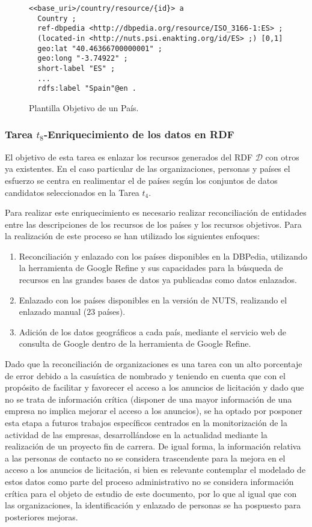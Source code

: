 \begin{figure}[!htp]
\begin{lstlisting} 
<<base_uri>/country/resource/{id}> a 
  Country ;
  ref-dbpedia <http://dbpedia.org/resource/ISO_3166-1:ES> ;
  (located-in <http://nuts.psi.enakting.org/id/ES> ;) [0,1]
  geo:lat "40.46366700000001" ;
  geo:long "-3.74922" ;
  short-label "ES" ;
  ...
  rdfs:label "Spain"@en .
\end{lstlisting}
	\caption{Plantilla Objetivo de un País.}
	\label{fig:country-template}
\end{figure}


\subsubsection{Tarea $t_8$-Enriquecimiento de los datos en RDF}\label{t8-orgs}
El objetivo de esta tarea es enlazar los recursos generados del \dataset \gls{RDF} $\mathcal{D}$ con otros 
ya existentes. En el caso particular de las organizaciones, personas y países el esfuerzo se centra 
en realimentar el \dataset de países según los conjuntos de datos candidatos seleccionados en la Tarea $t_4$.

Para realizar este enriquecimiento es necesario realizar reconciliación de entidades entre las descripciones 
de los recursos de los países y los recursos objetivos. Para la realización de este proceso se han utilizado los 
siguientes enfoques:
\begin{enumerate}
 \item Reconciliación y enlazado con los países disponibles en la DBPedia, utilizando la herramienta de Google 
Refine y sus capacidades para la búsqueda de recursos en las grandes bases de datos ya publicadas como datos enlazados.
 \item Enlazado con los países disponibles en la versión \linkeddata de \gls{NUTS}, realizando el enlazado manual ($23$ países).
 \item Adición de los datos geográficos a cada país, mediante el servicio web de consulta de Google dentro de la herramienta 
de Google Refine.
\end{enumerate}

Dado que la reconciliación de organizaciones es una tarea con un alto porcentaje de error debido a la casuística de nombrado 
y teniendo en cuenta que con el propósito de facilitar y favorecer el acceso a los anuncios de licitación y dado que no se trata de información 
crítica (disponer de una mayor información de una empresa no implica mejorar el acceso a los anuncios), se ha optado por posponer 
esta etapa a futuros trabajos específicos centrados en la monitorización de la actividad de las empresas, desarrollándose en la actualidad 
mediante la realización de un proyecto fin de carrera. De igual forma, la información relativa a las personas de contacto no se considera 
trascendente para la mejora en el acceso a los anuncios de licitación, si bien es relevante contemplar el modelado de estos datos como parte del 
proceso administrativo no se considera información crítica para el objeto de estudio de este documento, 
por lo que al igual que con las organizaciones, la identificación y enlazado de personas se ha pospuesto para posteriores mejoras.



